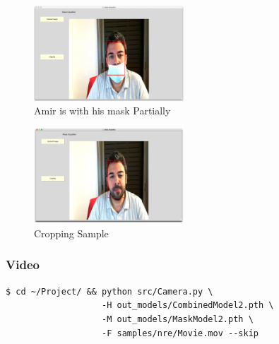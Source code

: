 \begin{figure}[H]
    \centering
    \includegraphics[width=0.5\textwidth]{images/Demo/Partial.png}
    \caption{Amir is with his mask Partially}
    \label{fig:PartialMaskedAmir}
\end{figure}
\begin{figure}[H]
    \centering
    \includegraphics[width=0.5\textwidth]{images/Demo/Unmasked.png}
    \caption{Cropping Sample}
    \label{fig:Amir is with his mask OFF}
\end{figure}
\subsubsection{Video}
\begin{verbatim}
$ cd ~/Project/ && python src/Camera.py \
                   -H out_models/CombinedModel2.pth \
                   -M out_models/MaskModel2.pth \
                   -F samples/nre/Movie.mov --skip
\end{verbatim}

